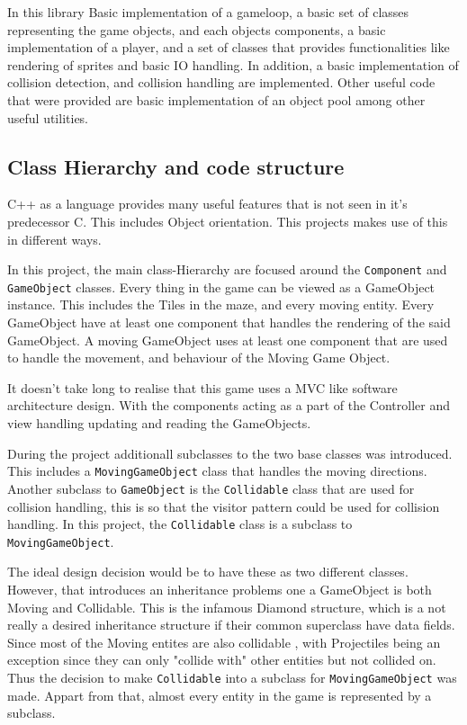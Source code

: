 \documentclass{article}
\begin{document}
  In this library Basic implementation of a gameloop, a basic set of classes representing the game objects, and each objects components, a basic implementation of a player, and a set of classes that provides functionalities like rendering of sprites and basic IO handling. In addition, a basic implementation of collision detection, and collision handling are implemented.
  Other useful code that were provided are basic implementation of an object pool among other useful utilities.

  \subsection{Class Hierarchy and code structure}
  C++ as a language provides many useful features that is not seen in it's predecessor C. This includes Object orientation. This projects makes use of this in different ways.

  In this project, the main class-Hierarchy are focused around the \texttt{Component} and \texttt{GameObject} classes. Every thing in the game can be viewed as a GameObject instance. This includes the Tiles in the maze, and every moving entity. Every GameObject have at least one component that handles the rendering of the said GameObject. A moving GameObject uses at least one component that are used to handle the movement, and behaviour of the Moving Game Object.

  It doesn't take long to realise that this game uses a MVC like software architecture design. With the components acting as a part of the Controller and view handling updating and reading the GameObjects.

  During the project additionall subclasses to the two base classes was introduced. This includes a \texttt{MovingGameObject} class that handles the moving directions. Another subclass to \texttt{GameObject} is the \texttt{Collidable} class that are used for collision handling, this is so that the visitor pattern could be used for collision handling. In this project, the \texttt{Collidable} class is a subclass to \texttt{MovingGameObject}.

  The ideal design decision would be to have these as two different classes. However, that introduces an inheritance problems one a GameObject is both Moving and Collidable. This is the infamous Diamond structure, which is a not really a desired inheritance structure if their common superclass have data fields. Since most of the Moving entites are also collidable , with Projectiles being an exception since they can only "collide with" other entities but not collided on.
  Thus the decision to make \texttt{Collidable} into a subclass for \texttt{MovingGameObject} was made. Appart from that, almost every entity in the game is represented by a subclass.
\end{document}
